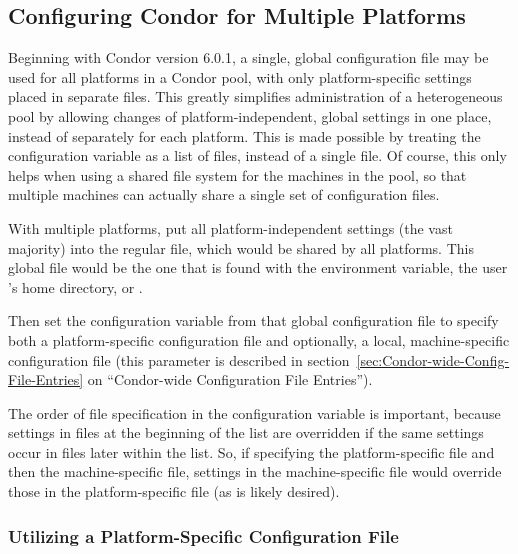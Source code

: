 \subsection{\label{sec:Multiple-Platforms}Configuring Condor for
Multiple Platforms} 

Beginning with Condor version 6.0.1, a single, global
configuration file may be used for all platforms in a Condor pool, with only
platform-specific settings placed in separate files.  This greatly
simplifies administration of a heterogeneous pool by allowing
changes of platform-independent, global settings in one place, instead of
separately for each platform.  This is made possible by treating the
 configuration variable as a
list of files, instead of a single file.  Of course, this only
helps when using a shared file system for the machines in the
pool, so that multiple machines can actually share a single set of
configuration files.

With multiple platforms, put all
platform-independent settings (the vast majority) into the regular
 file, which would be shared by all platforms.
This global file would be the one that is found with the
 environment variable, the user 's home
directory, or .

Then set the  configuration variable from that
global configuration file to specify both a platform-specific
configuration file and
optionally, a local, machine-specific configuration file (this parameter is
described in section~\ref{sec:Condor-wide-Config-File-Entries} on
``Condor-wide Configuration File Entries'').

The order of file specification in the
 configuration variable is important,
because settings
in files at the beginning of the list are overridden if the same
settings occur in files later within the list.  So, if specifying the
platform-specific file and then the machine-specific file, settings in
the machine-specific file would override those in the
platform-specific file (as is likely desired).  

\subsubsection{\label{sec:Specify-Platform-Files}Utilizing a
Platform-Specific Configuration File} 


